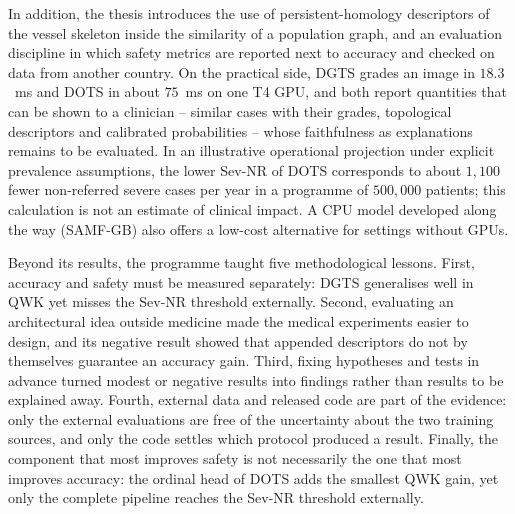 

In addition, the thesis introduces the use
of persistent-homology descriptors of the vessel skeleton inside the similarity of a
population graph, and an evaluation discipline in which safety metrics are reported next to
accuracy and checked on data from another country. On the practical side, DGTS grades an
image in $18.3$~ms and DOTS in about $75$~ms on one T4 GPU, and both report quantities that
can be shown to a clinician -- similar cases with their grades, topological descriptors and
calibrated probabilities -- whose faithfulness as explanations remains to be evaluated.
In an illustrative operational projection under explicit prevalence assumptions, the
lower Sev-NR of DOTS corresponds to about $1{,}100$ fewer non-referred severe cases per
year in a programme of $500{,}000$ patients; this calculation is not an estimate of
clinical impact. A CPU model developed along the way (SAMF-GB) also offers a low-cost alternative for
settings without GPUs.

Beyond its results, the programme taught five methodological lessons. First, accuracy and
safety must be measured separately: DGTS generalises well in QWK yet misses the Sev-NR
threshold externally. Second, evaluating an architectural idea outside medicine made the
medical experiments easier to design, and its negative result showed that appended
descriptors do not by themselves guarantee an accuracy gain. Third, fixing hypotheses and
tests in advance turned modest or negative results into findings rather than results to
be explained away. Fourth, external data and released code are part of the evidence: only
the external evaluations are free of the uncertainty about the two training sources, and
only the code settles which protocol produced a result. Finally, the component that most
improves safety is not necessarily the one that most improves accuracy: the ordinal head of
DOTS adds the smallest QWK gain, yet only the complete pipeline reaches the Sev-NR threshold
externally.

\label{sec:limits-gc}
